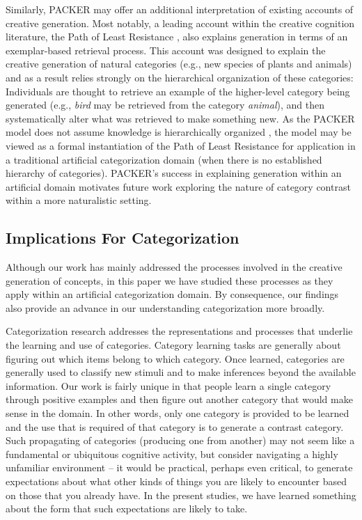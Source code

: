 \documentclass[12pt]{article}
\begin{document}
\begin{flushleft}
Similarly, PACKER may offer an additional interpretation of existing accounts of
creative generation. Most notably, a leading account within the creative
cognition literature, the Path of Least Resistance
\citep{ward1994structured,ward1995s}, also explains generation in terms of an
exemplar-based retrieval process. This account was designed to explain the
creative generation of natural categories (e.g., new species of plants and
animals) and as a result relies strongly on the hierarchical organization of
these categories: Individuals are thought to retrieve an example of the
higher-level category being generated (e.g., \textit{bird} may be retrieved from
the category \textit{animal}), and then systematically alter what was retrieved
to make something new. As the PACKER model does not assume knowledge is
hierarchically organized \citep[this is true of the exemplar view more broadly,
see][]{murphy2016exemplar}, the model may be viewed as a formal instantiation of
the Path of Least Resistance for application in a traditional artificial
categorization domain (when there is no established hierarchy of categories).
PACKER's success in explaining generation within an artificial domain motivates
future work exploring the nature of category contrast within a more naturalistic
setting.

\subsection{Implications For Categorization}

Although our work has mainly addressed the processes involved in the creative
generation of concepts, in this paper we have studied these processes as they
apply within an artificial categorization domain. By consequence, our findings
also provide an advance in our understanding categorization more broadly.

Categorization research addresses the representations and processes that
underlie the learning and use of categories. Category learning tasks are
generally about figuring out which items belong to which category. Once learned,
categories are generally used to classify new stimuli and to make inferences
beyond the available information. Our work is fairly unique in that people learn
a single category through positive examples and then figure out another category
that would make sense in the domain. In other words, only one category is
provided to be learned and the use that is required of that category is to
generate a contrast category. Such propagating of categories (producing one from
another) may not seem like a fundamental or ubiquitous cognitive activity, but
consider navigating a highly unfamiliar environment -- it would be practical,
perhaps even critical, to generate expectations about what other kinds of things
you are likely to encounter based on those that you already have. In the present
studies, we have learned something about the form that such expectations are
likely to take.


\end{flushleft}
\end{document}
